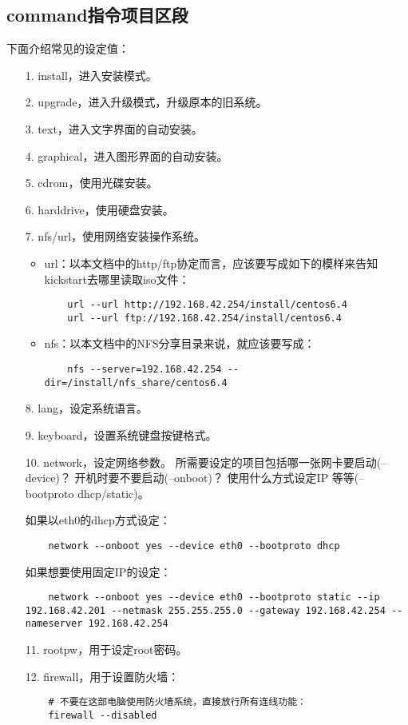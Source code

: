 \documentclass[a4paper,left=1.5cm,right=1.5cm,11pt]{article}
\begin{document}
\subsection{command指令项目区段}
	下面介绍常见的设定值：
	\begin{itemize}
		\item[1.] install，进入安装模式。
		\item[2.] upgrade，进入升级模式，升级原本的旧系统。
		\item[3.] text，进入文字界面的自动安装。
		\item[4.] graphical，进入图形界面的自动安装。
		\item[5.] cdrom，使用光碟安装。
		\item[6.] harddrive，使用硬盘安装。
		\item[7.] nfs/url，使用网络安装操作系统。
		\begin{itemize}
			\item url：以本文档中的http/ftp协定而言，应该要写成如下的模样来告知kickstart去哪里读取iso文件： 
			\begin{lstlisting}
	url --url http://192.168.42.254/install/centos6.4 
	url --url ftp://192.168.42.254/install/centos6.4 
			\end{lstlisting}

			\item nfs：以本文档中的NFS分享目录来说，就应该要写成： 
			\begin{lstlisting}
	nfs --server=192.168.42.254 --dir=/install/nfs_share/centos6.4 
			\end{lstlisting}
		\end{itemize}

		\item[8.] lang，设定系统语言。
		\item[9.] keyboard，设置系统键盘按键格式。
		\item[10.] network，设定网络参数。 所需要设定的项目包括哪一张网卡要启动(--device)？ 开机时要不要启动(--onboot)？ 使用什么方式设定IP 等等(--bootproto dhcp/static)。\par

				   如果以eth0的dhcp方式设定：
				   \begin{lstlisting}
	network --onboot yes --device eth0 --bootproto dhcp 
				   \end{lstlisting}

				   如果想要使用固定IP的设定：
				   \begin{lstlisting}
	network --onboot yes --device eth0 --bootproto static --ip 192.168.42.201 --netmask 255.255.255.0 --gateway 192.168.42.254 --nameserver 192.168.42.254
				   \end{lstlisting}
		\item[11.] rootpw，用于设定root密码。
		\item[12.] firewall，用于设置防火墙：
		\begin{lstlisting}
	# 不要在这部电脑使用防火墙系统，直接放行所有连线功能：
	firewall --disabled 


\end{lstlisting}
\end{itemize}
\end{document}
